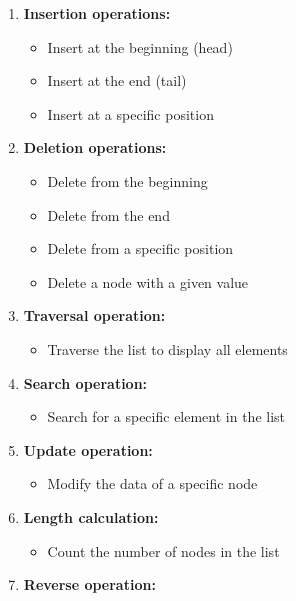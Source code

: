 \begin{enumerate}
\def\labelenumi{\arabic{enumi}.}
\tightlist
\item
  \textbf{Insertion operations:}

  \begin{itemize}
  \tightlist
  \item
    Insert at the beginning (head)
  \item
    Insert at the end (tail)
  \item
    Insert at a specific position
  \end{itemize}
\item
  \textbf{Deletion operations:}

  \begin{itemize}
  \tightlist
  \item
    Delete from the beginning
  \item
    Delete from the end
  \item
    Delete from a specific position
  \item
    Delete a node with a given value
  \end{itemize}
\item
  \textbf{Traversal operation:}

  \begin{itemize}
  \tightlist
  \item
    Traverse the list to display all elements
  \end{itemize}
\item
  \textbf{Search operation:}

  \begin{itemize}
  \tightlist
  \item
    Search for a specific element in the list
  \end{itemize}
\item
  \textbf{Update operation:}

  \begin{itemize}
  \tightlist
  \item
    Modify the data of a specific node
  \end{itemize}
\item
  \textbf{Length calculation:}

  \begin{itemize}
  \tightlist
  \item
    Count the number of nodes in the list
  \end{itemize}
\item
  \textbf{Reverse operation:}


\end{enumerate}
